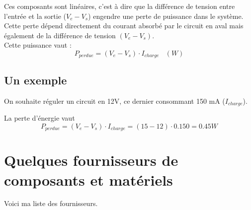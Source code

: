 
  Ces composants sont linéaires, c'est à dire que la différence de tension entre l'entrée et la sortie ($V_{e}-V_s$) engendre une perte de puissance dans le système.\\
  Cette perte dépend directement du courant absorbé par le circuit en aval mais également de la différence de tension $(V_e-V_s)$.\\
  Cette puissance vaut : $$ P_{perdue} =(V_e-V_s)\cdot I_{charge} ~~~~(W)$$

  \subsection{Un exemple}

  On souhaite réguler un circuit en 12V, ce dernier consommant 150 mA ($I_{charge}$).

  La perte d'énergie vaut $$ P_{perdue} =(V_e-V_s)\cdot I_{charge} =(15-12)\cdot 0.150 = 0.45 W$$





  \appendix

  \section{Quelques fournisseurs de composants et matériels}

  Voici ma liste des fournisseurs.

